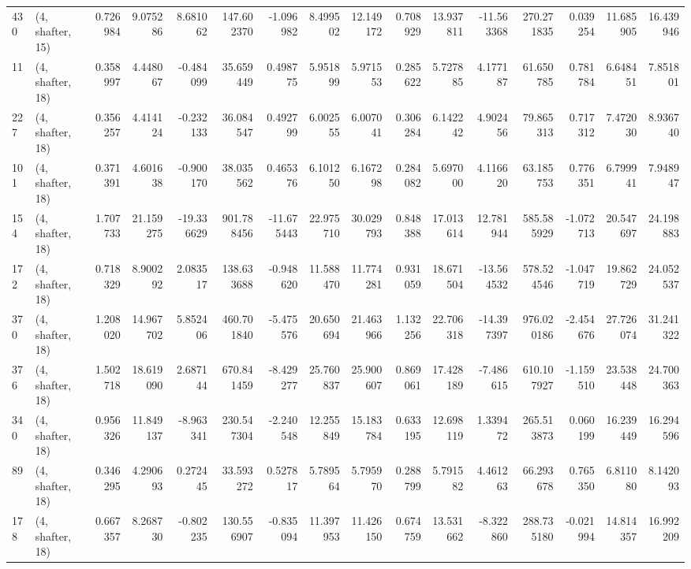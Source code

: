 \begin{tabular}{llrrrrrrrrrrrrrr}
430 &  (4, shafter, 15) &   0.726984 &   9.075286 &   8.681062 &   147.602370 &  -1.096982 &   8.499502 &  12.149172 &  0.708929 &  13.937811 & -11.563368 &   270.271835 &   0.039254 &  11.685905 &  16.439946 \\
11  &  (4, shafter, 18) &   0.358997 &   4.448067 &  -0.484099 &    35.659449 &   0.498775 &   5.951899 &   5.971553 &  0.285622 &   5.727885 &   4.177187 &    61.650785 &   0.781784 &   6.648451 &   7.851801 \\
227 &  (4, shafter, 18) &   0.356257 &   4.414124 &  -0.232133 &    36.084547 &   0.492799 &   6.002555 &   6.007041 &  0.306284 &   6.142242 &   4.902456 &    79.865313 &   0.717312 &   7.472030 &   8.936740 \\
101 &  (4, shafter, 18) &   0.371391 &   4.601638 &  -0.900170 &    38.035562 &   0.465376 &   6.101250 &   6.167298 &  0.284082 &   5.697000 &   4.116620 &    63.185753 &   0.776351 &   6.799941 &   7.948947 \\
154 &  (4, shafter, 18) &   1.707733 &  21.159275 & -19.336629 &   901.788456 & -11.675443 &  22.975710 &  30.029793 &  0.848388 &  17.013614 &  12.781944 &   585.585929 &  -1.072713 &  20.547697 &  24.198883 \\
172 &  (4, shafter, 18) &   0.718329 &   8.900292 &   2.083517 &   138.633688 &  -0.948620 &  11.588470 &  11.774281 &  0.931059 &  18.671504 & -13.564532 &   578.524546 &  -1.047719 &  19.862729 &  24.052537 \\
370 &  (4, shafter, 18) &   1.208020 &  14.967702 &   5.852406 &   460.701840 &  -5.475576 &  20.650694 &  21.463966 &  1.132256 &  22.706318 & -14.397397 &   976.020186 &  -2.454676 &  27.726074 &  31.241322 \\
376 &  (4, shafter, 18) &   1.502718 &  18.619090 &   2.687144 &   670.841459 &  -8.429277 &  25.760837 &  25.900607 &  0.869061 &  17.428189 &  -7.486615 &   610.107927 &  -1.159510 &  23.538448 &  24.700363 \\
340 &  (4, shafter, 18) &   0.956326 &  11.849137 &  -8.963341 &   230.547304 &  -2.240548 &  12.255849 &  15.183784 &  0.633195 &  12.698119 &   1.339472 &   265.513873 &   0.060199 &  16.239449 &  16.294596 \\
89  &  (4, shafter, 18) &   0.346295 &   4.290693 &   0.272445 &    33.593272 &   0.527817 &   5.789564 &   5.795970 &  0.288799 &   5.791582 &   4.461263 &    66.293678 &   0.765350 &   6.811080 &   8.142093 \\
178 &  (4, shafter, 18) &   0.667357 &   8.268730 &  -0.802235 &   130.556907 &  -0.835094 &  11.397953 &  11.426150 &  0.674759 &  13.531662 &  -8.322860 &   288.735180 &  -0.021994 &  14.814357 &  16.992209 \\

\end{tabular}
